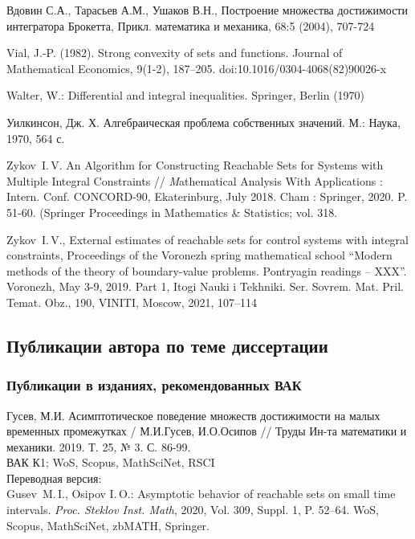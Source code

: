 \documentclass[../main.tex]{subfiles}
\begin{document}
\begin{thebibliography}{99}
Вдовин С.А., Тарасьев А.М., Ушаков В.Н., Построение множества достижимости интегратора Брокетта, Прикл. математика и механика, 68:5 (2004), 707-724

Vial, J.-P. (1982). Strong convexity of sets and functions. Journal of Mathematical Economics, 9(1-2), 187–205. doi:10.1016/0304-4068(82)90026-x

Walter, W.: Differential and integral inequalities. Springer, Berlin (1970)

Уилкинсон, Дж. Х.
Алгебраическая проблема собственных значений.
М.: Наука, 1970, 564 с.

Zykov~I.\,V. An Algorithm for Constructing Reachable Sets for Systems with Multiple Integral Constraints  // {\textit Mathematical Analysis With Applications : Intern. Conf. CONCORD-90}, Ekaterinburg, July 2018. Cham : Springer, 2020. P. 51-60. (Springer Proceedings in Mathematics \& Statistics; vol. 318. 

Zykov~I.\,V., External estimates of reachable sets for control systems with integral constraints, Proceedings of the Voronezh spring mathematical school “Modern methods of the theory of boundary-value problems. Pontryagin readings – XXX”. Voronezh, May 3-9, 2019. Part 1, Itogi Nauki i Tekhniki. Ser. Sovrem. Mat. Pril. Temat. Obz., 190, VINITI, Moscow, 2021, 107–114 

 \subsection*{Публикации автора по теме диссертации}
\subsubsection*{Публикации в изданиях, рекомендованных ВАК}
Гусев, М.И. 
Асимптотическое поведение множеств достижимости на малых временных промежутках / 
М.И.Гусев, И.О.Осипов // 
Труды Ин-та математики и механики. 
2019. Т. 25, № 3. С. 86-99. 
 \\
ВАК К1; WoS, Scopus, MathSciNet, RSCI
\\ Переводная версия: \\
Gusev~M.\,I., Osipov I.\,O.: Asymptotic behavior of reachable sets on small time intervals. \emph{Proc. Steklov Inst. Math}, 2020, Vol. 309, Suppl. 1, P. 52--64.  
WoS, Scopus, MathSciNet, zbMATH, Springer.


\end{thebibliography}
\end{document}
